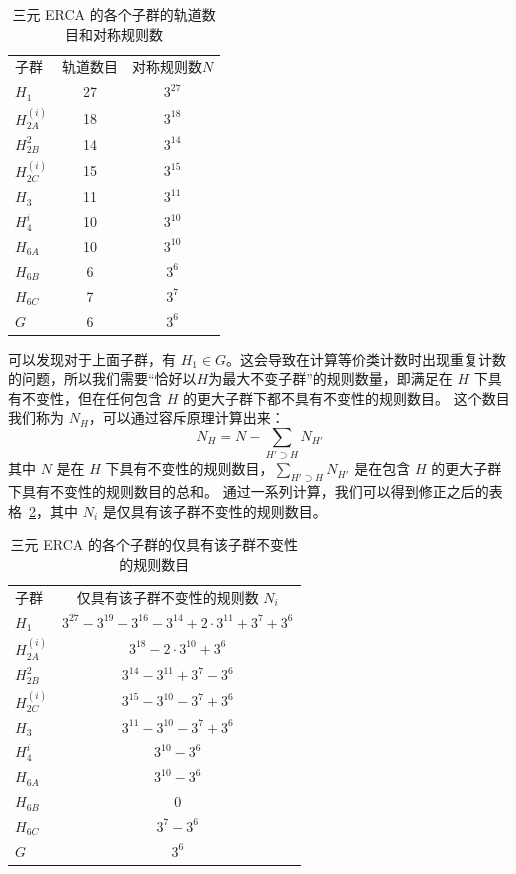 \documentclass[reprint, amsmath, amssymb, aps, physrev,prb]{revtex4-2}
\begin{document}
\begin{table}[htbp]
\caption{\label{tab:orbit_count} 三元 ERCA 的各个子群的轨道数目和对称规则数}
\begin{ruledtabular}
\begin{tabular}{lcc}
子群 & 轨道数目 & 对称规则数$N$\\
\colrule
$H_1$ & 27 & $3^{27}$ \\
$H_{2A}^{(i)}$ & 18 & $3^{18}$ \\
$H_{2B}^2$ & 14 & $3^{14}$ \\
$H_{2C}^{(i)}$ & 15 & $3^{15}$ \\
$H_3$ & 11 & $3^{11}$ \\
$H_4^{i}$ & 10 & $3^{10}$ \\
$H_{6A}$ & 10 & $3^{10}$ \\
$H_{6B}$ & 6 & $3^{6}$ \\
$H_{6C}$ & 7 & $3^{7}$ \\
$G$ & 6 & $3^{6}$ \\
\end{tabular}
\end{ruledtabular}
\end{table}

可以发现对于上面子群，有 $H_1 \in G$。这会导致在计算等价类计数时出现重复计数的问题，所以我们需要“恰好以$H$为最大不变子群”的规则数量，即满足在 $H$ 下具有不变性，但在任何包含 $H$ 的更大子群下都不具有不变性的规则数目。
这个数目我们称为 $N_H$，可以通过容斥原理计算出来：
\begin{equation}
    N_H = N - \sum_{H' \supset H} N_{H'}
\end{equation}
其中 $N$ 是在 $H$ 下具有不变性的规则数目，$\sum_{H' \supset H} N_{H'}$ 是在包含 $H$ 的更大子群下具有不变性的规则数目的总和。
通过一系列计算，我们可以得到修正之后的表格~\ref{tab:corrected}，其中 $N_i$ 是仅具有该子群不变性的规则数目。
\begin{table}[htp]
\caption{\label{tab:corrected} 三元 ERCA 的各个子群的仅具有该子群不变性的规则数目}
\begin{ruledtabular}
\begin{tabular}{lc}
子群 & 仅具有该子群不变性的规则数 $N_i$ \\
\colrule
$H_1$ & $3^{27} - 3^{19} - 3^{16} - 3^{14} + 2 \cdot 3^{11} + 3^{7} +3^{6}$ \\
$H_{2A}^{(i)}$ & $3^{18} - 2 \cdot 3^{10}  + 3^{6}$\\
$H_{2B}^2$ & $3^{14} - 3^{11} + 3^{7} - 3^{6}$\\
$H_{2C}^{(i)}$ & $3^{15} - 3^{10} - 3^{7} + 3^{6}$ \\
$H_3$ & $3^{11}- 3^{10} - 3^{7} + 3^{6}$ \\
$H_4^{i}$ & $3^{10} - 3^{6}$ \\
$H_{6A}$ &  $3^{10} - 3^{6}$ \\
$H_{6B}$ &  0 \\
$H_{6C}$ &  $3^{7} - 3^{6}$ \\
$G$ &  $3^{6}$ \\
\end{tabular}
\end{ruledtabular}
\end{table}
\end{document}
